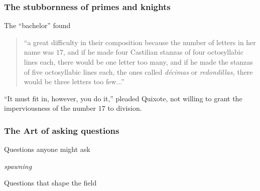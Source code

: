 \documentclass{beamer}
\begin{document}
\begin{frame}\frametitle{\bf The stubbornness of primes and knights}
The
``bachelor'' found
\vskip10pt

\begin{quote}
  ``a great difficulty in their composition because the number of
  letters in her name was $17$, and if he made four Castilian stanzas
  of four octosyllabic lines each, there would be one letter too many,
  and if he made the stanzas of five octosyllabic lines each, the ones
  called {\em d{\'e}cimas} or {\em redondillas,} there would be three
  letters too few...''
\end{quote}

``It must fit in, however, you do it,'' pleaded Quixote, not willing to
grant the imperviousness of the number $17$ to division.
\end{frame}
\begin{frame}\frametitle{\bf The Art of asking questions}
\vskip10pt

{\Huge

\centerline{Questions anyone might ask}
\vskip10pt
\centerline{\it spawning}
\vskip10pt
\centerline{Questions that shape the field}}
\end{frame}
\end{document}
